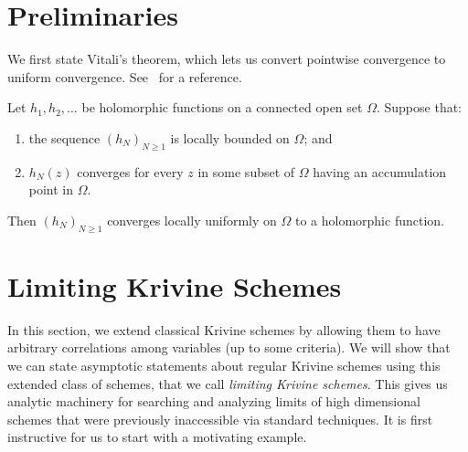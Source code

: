 \section{Preliminaries}

We first state Vitali's theorem, which lets us convert pointwise convergence to uniform convergence. See~\cite{schiff1993normal} for a reference. 

\begin{fact}
Let \(h_1,h_2,\ldots\) be holomorphic functions on a connected open set
\(\Omega\). Suppose that:
\begin{enumerate}
    \item the sequence \((h_N)_{N\geq 1}\) is locally bounded on \(\Omega\); and
    \item \(h_N(z)\) converges for every \(z\) in some subset of \(\Omega\)
    having an accumulation point in \(\Omega\).
\end{enumerate}
Then \((h_N)_{N\geq 1}\) converges locally uniformly on \(\Omega\) to a
holomorphic function.
\end{fact}


\section{Limiting Krivine Schemes}

In this section, we extend classical Krivine schemes by allowing them to have arbitrary correlations among variables (up to some criteria). We will show that we can state asymptotic statements about regular Krivine schemes using this extended class of schemes, that we call \textit{limiting Krivine schemes}. This gives us analytic machinery for searching and analyzing limits of high dimensional schemes that were previously inaccessible via standard techniques. It is first instructive for us to start with a motivating example. 

